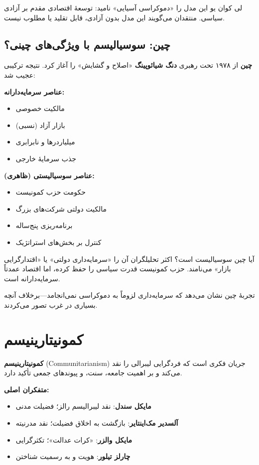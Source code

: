 لی کوان یو این مدل را «دموکراسی آسیایی» نامید: توسعهٔ اقتصادی مقدم بر آزادی سیاسی. منتقدان می‌گویند این مدل بدون آزادی، قابل تقلید یا مطلوب نیست.


\subsection{چین: سوسیالیسم با ویژگی‌های چینی؟}


\textbf{چین} از ۱۹۷۸ تحت رهبری \textbf{دنگ شیائوپینگ} «اصلاح و گشایش» را آغاز کرد. نتیجه ترکیبی عجیب شد:

\textbf{عناصر سرمایه‌دارانه:}
\begin{itemize}
    \item مالکیت خصوصی
    \item بازار آزاد (نسبی)
    \item میلیاردرها و نابرابری
    \item جذب سرمایهٔ خارجی
\end{itemize}

\textbf{عناصر سوسیالیستی (ظاهری):}
\begin{itemize}
    \item حکومت حزب کمونیست
    \item مالکیت دولتی شرکت‌های بزرگ
    \item برنامه‌ریزی پنج‌ساله
    \item کنترل بر بخش‌های استراتژیک
\end{itemize}

آیا چین سوسیالیست است؟ اکثر تحلیلگران آن را «سرمایه‌داری دولتی» یا «اقتدارگرایی بازار» می‌نامند. حزب کمونیست قدرت سیاسی را حفظ کرده، اما اقتصاد عمدتاً سرمایه‌دارانه است.

تجربهٔ چین نشان می‌دهد که سرمایه‌داری لزوماً به دموکراسی نمی‌انجامد—برخلاف آنچه بسیاری در غرب تصور می‌کردند.


\section{کمونیتارینیسم}

\begin{tcolorbox}[
    enhanced,
    colback=rightblue!8,
    colframe=rightblue,
    boxrule=1.5pt,
    arc=5pt,
    fonttitle=\bfseries,
    title={\rl{🔵 مفهوم کلیدی: کمونیتارینیسم}}
]
\textbf{کمونیتارینیسم} (Communitarianism) جریان فکری است که فردگرایی لیبرالی را نقد می‌کند و بر اهمیت جامعه، سنت، و پیوندهای جمعی تأکید دارد.

\textbf{متفکران اصلی:}
\begin{itemize}
    \item \textbf{مایکل سندل}: نقد لیبرالیسم رالز؛ فضیلت مدنی
    \item \textbf{آلسدیر مک‌اینتایر}: بازگشت به اخلاق فضیلت؛ نقد مدرنیته
    \item \textbf{مایکل والزر}: «کرات عدالت»؛ تکثرگرایی
    \item \textbf{چارلز تیلور}: هویت و به رسمیت شناختن
\end{itemize}
\end{tcolorbox}


